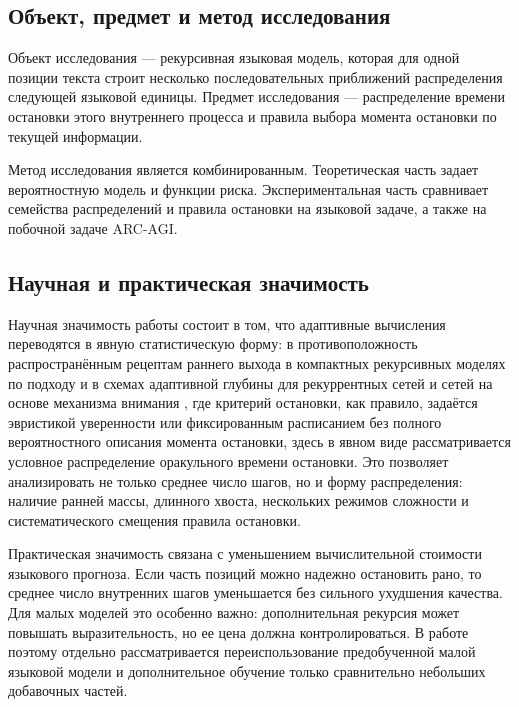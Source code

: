\subsection{Объект, предмет и метод исследования}

Объект исследования --- рекурсивная языковая модель, которая для одной позиции текста строит
несколько последовательных приближений распределения следующей языковой единицы. Предмет
исследования --- распределение времени остановки этого внутреннего процесса и правила выбора
момента остановки по текущей информации.

Метод исследования является комбинированным. Теоретическая часть задает вероятностную модель и
функции риска. Экспериментальная часть сравнивает семейства распределений и правила остановки на
языковой задаче, а также на побочной задаче ARC-AGI.
  
\subsection{Научная и практическая значимость}

Научная значимость работы состоит в том, что адаптивные вычисления переводятся в явную
статистическую форму: в противоположность распространённым рецептам раннего выхода в компактных
рекурсивных моделях по подходу \cite{trm} и в схемах адаптивной глубины для рекуррентных сетей и
сетей на основе механизма внимания \cite{grave2016,elbayad2020}, где критерий остановки, как
правило, задаётся эвристикой уверенности или фиксированным расписанием без полного вероятностного
описания момента остановки, здесь в явном виде рассматривается условное распределение оракульного
времени остановки. Это позволяет анализировать не только среднее число шагов, но и форму
распределения: наличие ранней массы, длинного хвоста, нескольких режимов сложности и
систематического смещения правила остановки.

Практическая значимость связана с уменьшением вычислительной стоимости языкового прогноза. Если
часть позиций можно надежно остановить рано, то среднее число внутренних шагов уменьшается без
сильного ухудшения качества. Для малых моделей это особенно важно: дополнительная рекурсия может
повышать выразительность, но ее цена должна контролироваться. В работе поэтому отдельно
рассматривается переиспользование предобученной малой языковой модели и дополнительное обучение
только сравнительно небольших добавочных частей.
